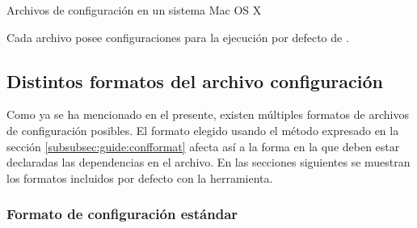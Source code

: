 \begin{folders}[ht]
	\begin{framed}
	\end{framed}   
	\caption{Archivos de configuración en un sistema Mac OS X}
	\label{folders:conf:osx}
\end{folders}
Cada archivo posee configuraciones para la ejecución por defecto de \fronttier.\\

\subsection{Distintos formatos del archivo configuración}
\label{subsec:formats}

Como ya se ha mencionado en el presente, existen múltiples formatos de archivos
de configuración posibles. El formato elegido usando el método expresado en la
sección \ref{subsubsec:guide:confformat} afecta así a la forma en la que deben
estar declaradas las dependencias en el archivo. En las secciones siguientes
se muestran los formatos incluidos por defecto con la herramienta.

\subsubsection{Formato de configuración estándar}
\label{subsubsec:formats:standar}

